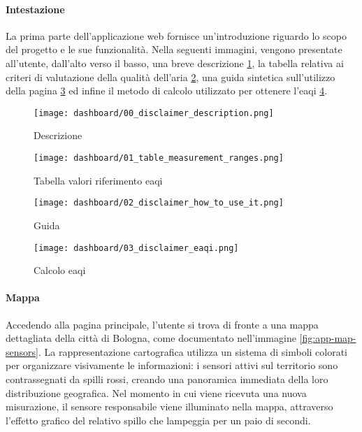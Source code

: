 \paragraph{Intestazione}

La prima parte dell'applicazione web fornisce un'introduzione riguardo lo scopo del progetto e le sue funzionalità.
Nella seguenti immagini, vengono presentate all'utente, dall'alto verso il basso,
una breve descrizione \ref{fig:app-description},
la tabella relativa ai criteri di valutazione della qualità dell'aria \ref{fig:app-eaqi-table},
una guida sintetica sull'utilizzo della pagina \ref{fig:app-guide} ed infine
il metodo di calcolo utilizzato per ottenere l'\acrfull{eaqi} \ref{fig:app-eaqi-calculation}.

\begin{figure}[H]
  \centering
  \texttt{[image: dashboard/00\_disclaimer\_description.png]}
  \caption{Descrizione}
  \label{fig:app-description}
\end{figure}

\begin{figure}[H]
  \centering
  \texttt{[image: dashboard/01\_table\_measurement\_ranges.png]}
  \caption{Tabella valori riferimento \acrfull{eaqi}}
  \label{fig:app-eaqi-table}
\end{figure}

\begin{figure}[H]
  \centering
  \texttt{[image: dashboard/02\_disclaimer\_how\_to\_use\_it.png]}
  \caption{Guida}
  \label{fig:app-guide}
\end{figure}

\begin{figure}[H]
  \centering
  \texttt{[image: dashboard/03\_disclaimer\_eaqi.png]}
  \caption{Calcolo \acrfull{eaqi}}
  \label{fig:app-eaqi-calculation}
\end{figure}

\paragraph{Mappa}

Accedendo alla pagina principale, l'utente si trova di fronte a una mappa dettagliata della città di Bologna,
come documentato nell'immagine \ref{fig:app-map-sensors}. La rappresentazione cartografica utilizza un sistema
di simboli colorati per organizzare visivamente le informazioni: i sensori attivi sul territorio
sono contrassegnati da spilli rossi, creando una panoramica immediata della loro distribuzione geografica.
Nel momento in cui viene ricevuta una nuova misurazione, il sensore responsabile viene illuminato nella mappa,
attraverso l'effetto grafico del relativo spillo che lampeggia per un paio di secondi.

